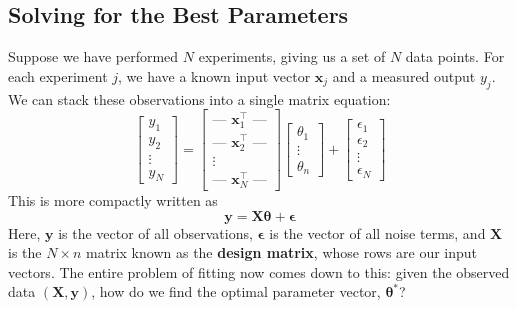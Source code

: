 \subsection{Solving for the Best Parameters}
Suppose we have performed $N$ experiments, giving us a set of $N$ data points. For each experiment $j$, we have a known input vector $\mathbf{x}_j$ and a measured output $y_j$. We can stack these observations into a single matrix equation:
\begin{equation}
    \begin{bmatrix}
        y_1 \\
        y_2 \\
        \vdots \\
        y_N
    \end{bmatrix}
    =
    \begin{bmatrix}
        \text{--- } \mathbf{x}_1^\top \text{ ---} \\
        \text{--- } \mathbf{x}_2^\top \text{ ---} \\
        \vdots \\
        \text{--- } \mathbf{x}_N^\top \text{ ---}
    \end{bmatrix}
    \begin{bmatrix}
        \theta_1 \\
        \vdots \\
        \theta_n
    \end{bmatrix}
    +
    \begin{bmatrix}
        \epsilon_1 \\
        \epsilon_2 \\
        \vdots \\
        \epsilon_N
    \end{bmatrix}
\end{equation}
This is more compactly written as
\begin{equation}
    \mathbf{y} = \mathbf{X}\boldsymbol{\theta} + \boldsymbol{\epsilon}
\end{equation}
Here, $\mathbf{y}$ is the vector of all observations, $\boldsymbol{\epsilon}$ is the vector of all noise terms, and $\mathbf{X}$ is the $N \times n$ matrix known as the \textbf{design matrix}, whose rows are our input vectors. The entire problem of fitting now comes down to this: given the observed data $(\mathbf{X}, \mathbf{y})$, how do we find the optimal parameter vector, $\boldsymbol{\theta}^*$?

